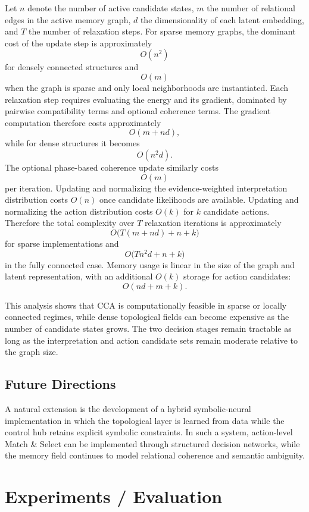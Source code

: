 \documentclass[10pt,journal,compsoc]{IEEEtran}
\begin{document}
Let $n$ denote the number of active candidate states, $m$ the number of relational edges in the active memory graph, $d$ the dimensionality of each latent embedding, and $T$ the number of relaxation steps. For sparse memory graphs, the dominant cost of the update step is approximately
\[
O(n^2)
\]
for densely connected structures and
\[
O(m)
\]
when the graph is sparse and only local neighborhoods are instantiated. Each relaxation step requires evaluating the energy and its gradient, dominated by pairwise compatibility terms and optional coherence terms. The gradient computation therefore costs approximately
\[
O(m + n d),
\]
while for dense structures it becomes
\[
O(n^2 d).
\]
The optional phase-based coherence update similarly costs
\[
O(m)
\]
per iteration. Updating and normalizing the evidence-weighted interpretation distribution costs $O(n)$ once candidate likelihoods are available. Updating and normalizing the action distribution costs $O(k)$ for $k$ candidate actions. Therefore the total complexity over $T$ relaxation iterations is approximately
\[
O\bigl(T(m + n d) + n + k\bigr)
\]
for sparse implementations and
\[
O\bigl(T n^2 d + n + k\bigr)
\]
in the fully connected case. Memory usage is linear in the size of the graph and latent representation, with an additional $O(k)$ storage for action candidates:
\[
O(n d + m + k).
\]

This analysis shows that CCA is computationally feasible in sparse or locally connected regimes, while dense topological fields can become expensive as the number of candidate states grows. The two decision stages remain tractable as long as the interpretation and action candidate sets remain moderate relative to the graph size.

\subsection{Future Directions}

A natural extension is the development of a hybrid symbolic-neural implementation in which the topological layer is learned from data while the control hub retains explicit symbolic constraints. In such a system, action-level Match \& Select can be implemented through structured decision networks, while the memory field continues to model relational coherence and semantic ambiguity.

\section{Experiments / Evaluation}
\end{document}
